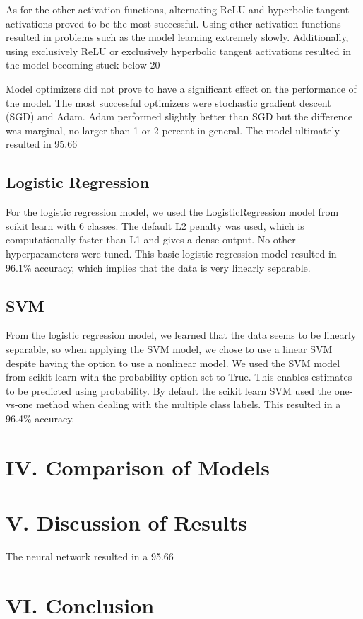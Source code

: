 \documentclass[12pt]{article}
\begin{document}
As for the other activation functions, alternating ReLU and hyperbolic tangent activations proved to be the most successful. Using other activation functions resulted in problems such as the model learning extremely slowly. Additionally, using exclusively ReLU or exclusively hyperbolic tangent activations resulted in the model becoming stuck below 20%

Model optimizers did not prove to have a significant effect on the performance of the model. The most successful optimizers were stochastic gradient descent (SGD) and Adam. Adam performed slightly better than SGD but the difference was marginal, no larger than 1 or 2 percent in general. The model ultimately resulted in 95.66%

\subsection*{Logistic Regression}
For the logistic regression model, we used the LogisticRegression model from scikit learn with 6 classes. The default L2 penalty was used, which is computationally faster than L1 and gives a dense output. No other hyperparameters were tuned. This basic logistic regression model resulted in 96.1\% accuracy, which implies that the data is very linearly separable.

\subsection*{SVM}
From the logistic regression model, we learned that the data seems to be linearly separable, so when applying the SVM model, we chose to use a linear SVM despite having the option to use a nonlinear model. We used the SVM model from scikit learn with the probability option set to True. This enables estimates to be predicted using probability. By default the scikit learn SVM used the one-vs-one method when dealing with the multiple class labels. This resulted in a 96.4\% accuracy.
\section*{IV. Comparison of Models}
\section*{V. Discussion of Results}
The neural network resulted in a 95.66%

\section*{VI. Conclusion}
\end{document}
